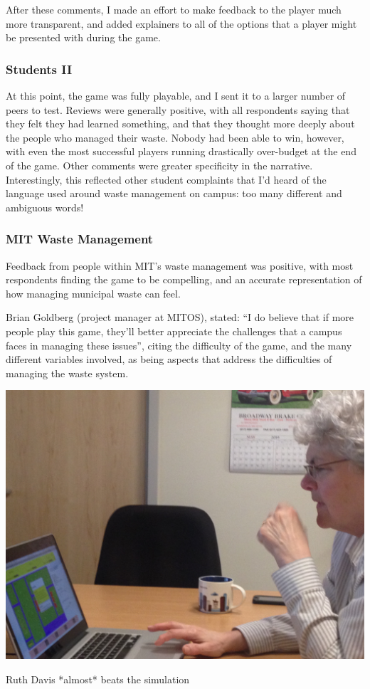 \documentclass[nofonts,nols,justified,nobib]{tufte-book}
\begin{document}
After these comments, I made an effort to make feedback to the player much more transparent, and added explainers to all of the options that a player might be presented with during the game. 

\subsubsection*{Students II}

At this point, the game was fully playable, and I sent it to a larger number of peers to test. Reviews were generally positive, with all respondents saying that they felt they had learned something, and that they thought more deeply about the people who managed their waste. Nobody had been able to win, however, with even the most successful players running drastically over-budget at the end of the game. Other comments were greater specificity in the narrative. Interestingly, this reflected other student complaints that I'd heard of the language used around waste management on campus: too many different and ambiguous words!

\subsubsection*{MIT Waste Management}
Feedback from people within MIT's waste management was positive, with most respondents finding the game to be compelling, and an accurate representation of how managing municipal waste can feel.

Brian Goldberg (project manager at MITOS), stated: ``I do believe that if more people play this game, they’ll better appreciate the challenges that a campus faces in managing these issues'', citing the difficulty of the game, and the many different variables involved, as being aspects that address the difficulties of managing the waste system.

\begin{marginfigure}
  \includegraphics[width=1\linewidth]{img/3/ruth2.jpg}
  \caption{Ruth Davis *almost* beats the simulation}
\end{marginfigure}
\end{document}
